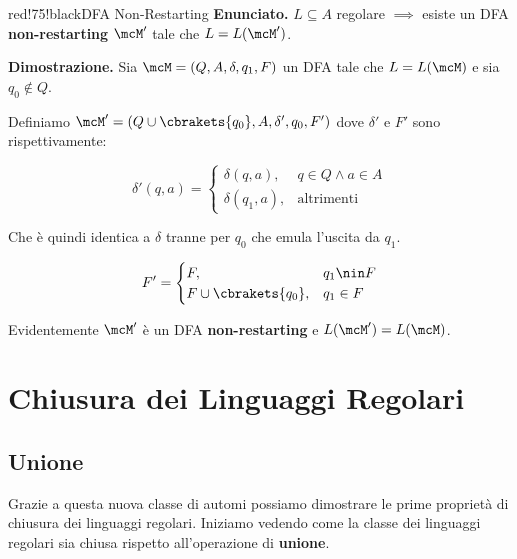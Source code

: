 \begin{halfframedbox}{red!75!black}{DFA Non-Restarting}
  \textbf{Enunciato. } \(L\subseteq A\) regolare \(\implies\) %
   esiste un DFA \textbf{non-restarting} \(\mcM'\) tale che \(L=L(\mcM')\).

  \begin{center}
    \textcolor{red!75!black}{\hdashrule[0.5ex]{18cm}{1pt}{3mm 3pt 1mm 2pt}}
  \end{center}

  \textbf{Dimostrazione. } Sia \(\mcM=(Q,A,\delta,q_1,F)\) un DFA tale che \(L=L(\mcM)\) e sia \(q_0 \nin Q\).

  Definiamo \(\mcM'=(Q\cup\cbrakets{q_0},A,\delta',q_0,F')\) dove \(\delta'\) e \(F'\) sono rispettivamente:

  \begin{equation}
    \delta'(q,a)=\begin{cases}
      \delta(q,a), & q \in Q \land a \in A\\
      \delta(q_1,a), &\text{altrimenti}
    \end{cases}
  \end{equation}

  Che è quindi identica a \(\delta\) tranne per \(q_0\) che emula l'uscita da \(q_1\).

  \begin{equation}
    F'=\begin{cases}
      F, & q_1 \nin F\\
      F \cup \cbrakets{q_0}, & q_1 \in F
    \end{cases}
  \end{equation}

  Evidentemente \(\mcM'\) è un DFA \textbf{non-restarting} e \(L(\mcM')=L(\mcM)\).
\end{halfframedbox}

\section{Chiusura dei Linguaggi Regolari}

\subsection{Unione}

Grazie a questa nuova classe di automi possiamo dimostrare le prime proprietà di chiusura dei linguaggi regolari. Iniziamo vedendo come la classe dei linguaggi regolari sia chiusa rispetto all'operazione di \textbf{unione}.

